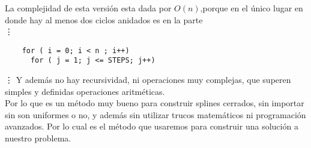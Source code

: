 La complejidad de esta versi\'on esta dada por $O(n)$,porque en el \'unico lugar
en donde hay al menos dos ciclos anidados es en la parte\\
\vdots
\begin{verbatim}
    for ( i = 0; i < n ; i++)
      for ( j = 1; j <= STEPS; j++)
\end{verbatim}
\vdots
Y adem\'as no hay recursividad, ni operaciones muy complejas, que superen simples
y definidas operaciones aritm\'eticas.\\
Por lo que es un m\'etodo muy bueno para construir splines cerrados,
sin importar sin son uniformes o no, y adem\'as sin utilizar trucos
matem\'aticos ni programaci\'on avanzados. Por lo cual es el m\'etodo
que usaremos para construir una soluci\'on a nuestro problema.

